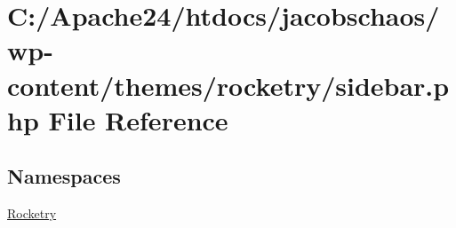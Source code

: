 \hypertarget{sidebar_8php}{}\section{C\+:/\+Apache24/htdocs/jacobschaos/wp-\/content/themes/rocketry/sidebar.php File Reference}
\label{sidebar_8php}
\subsection*{Namespaces}
\begin{DoxyCompactItemize}
\item 
 \hyperlink{namespace_rocketry}{Rocketry}
\end{DoxyCompactItemize}
